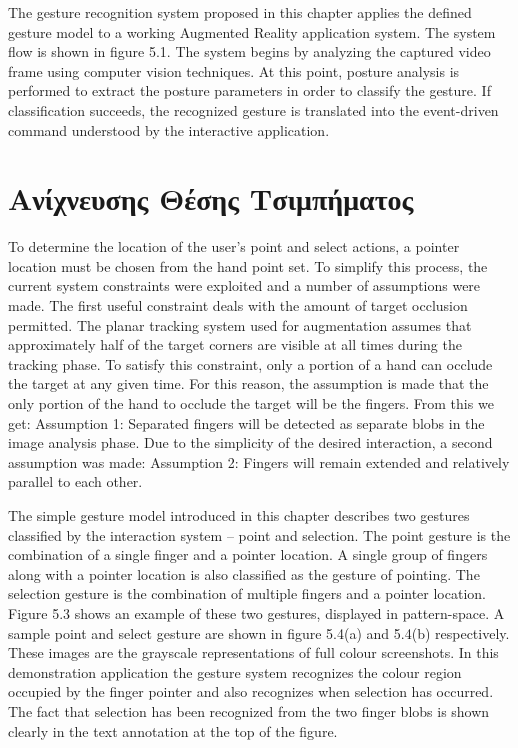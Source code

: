 The gesture recognition system proposed in this chapter applies the defined gesture model to a working Augmented Reality application system. The system flow is shown in figure 5.1. The system begins by analyzing the captured video frame using computer vision techniques. At this point, posture analysis is performed to extract the posture parameters in order to classify the gesture. If classification succeeds, the recognized gesture is translated into the event-driven command understood by the interactive application.
\section{Ανίχνευσης Θέσης Τσιμπήματος}



To determine the location of the user’s point and select actions, a pointer location must be chosen from the hand point set. To simplify this process, the current system constraints were exploited and a number of assumptions were made. The first useful constraint deals with the amount of target occlusion permitted. The planar tracking system used for augmentation assumes that approximately half of the target corners are visible at all times during the tracking phase. To satisfy this constraint, only a portion of a hand can occlude the target at any given time. For this reason, the assumption is made that the only portion of the hand to occlude the target will be the fingers. From this we get: Assumption 1: Separated fingers will be detected as separate blobs in the image analysis phase. Due to the simplicity of the desired interaction, a second assumption was made: Assumption 2: Fingers will remain extended and relatively parallel to each other.

The simple gesture model introduced in this chapter describes two gestures classified by the interaction system – point and selection. The point gesture is the combination of a single finger and a pointer location. A single group of fingers along with a pointer location is also classified as the gesture of pointing. The selection gesture is the combination of multiple fingers and a pointer location. Figure 5.3 shows an example of these two gestures, displayed in pattern-space. A sample point and select gesture are shown in figure 5.4(a) and 5.4(b) respectively. These images are the grayscale representations of full colour screenshots. In this demonstration application the gesture system recognizes the colour region occupied by the finger pointer and also recognizes when selection has occurred. The fact that selection has been recognized from the two finger blobs is shown clearly in the text annotation at the top of the figure.

